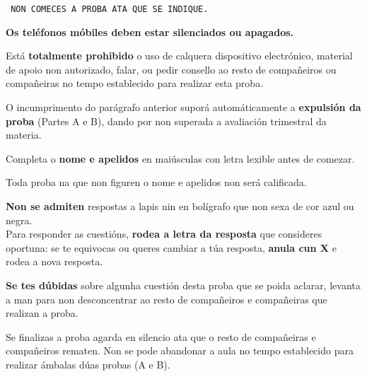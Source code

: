 %
\begin{instruccions}

    \par
    \vspace*{0.15cm}
    \begin{center} %
    \texttt{
    NON COMECES A PROBA ATA QUE SE INDIQUE.
    }
    \end{center}
    \begin{center} %
    \textbf{
    Os teléfonos móbiles deben estar silenciados ou apagados.
    }
    \end{center}
    Está \textbf{totalmente prohibido} o uso de calquera dispositivo electrónico, material de apoio non autorizado, falar, ou pedir consello ao resto de compañeiros ou compañeiras no tempo establecido para realizar esta proba.
    \par
    \vspace*{0.2cm}
    O incumprimento do parágrafo anterior suporá automáticamente a \textbf{expulsión da proba} (Partes A e B), dando por non superada a avaliación trimestral da materia. 
    \par
    \vspace*{0.2cm}
    Completa o \textbf{nome e apelidos} en maiúsculas con letra lexible antes de comezar.
    \par
    Toda proba na que non figuren o nome e apelidos non será calificada.
    \par
    \vspace*{0.15cm}
    \textbf{Non se admiten} respostas a lapis nin en bolígrafo que non sexa de cor azul ou negra.\\
    Para responder as cuestións, \textbf{rodea a letra da resposta} que consideres oportuna: se te equivocas ou queres cambiar a túa resposta, \textbf{anula cun X} e rodea a nova resposta.
    \par
    \vspace*{0.3cm}
    \textbf{Se tes dúbidas} sobre algunha cuestión desta proba que se poida aclarar, levanta a man para non desconcentrar ao resto de compañeiros e compañeiras que realizan a proba.
    \par
    \vspace*{0.20cm}
    Se finalizas a proba agarda en silencio ata que o resto de compañeiras e compañeiros rematen. Non se pode abandonar a aula no tempo establecido para realizar ámbalas dúas probas (A e B).
    \par
    \vspace*{0.15cm}

\end{instruccions}
